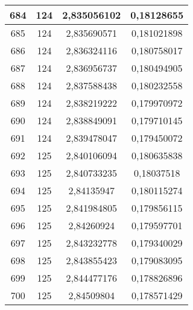 {\begin{minipage}[!h]{0.45\textwidth}
\begin{longtable}{cccc}
684 & 124 & 2,835056102 & 0,18128655 \\ \hline
685 & 124 & 2,835690571 & 0,181021898 \\ \hline
686 & 124 & 2,836324116 & 0,180758017 \\ \hline
687 & 124 & 2,836956737 & 0,180494905 \\ \hline
688 & 124 & 2,837588438 & 0,180232558 \\ \hline
689 & 124 & 2,838219222 & 0,179970972 \\ \hline
690 & 124 & 2,838849091 & 0,179710145 \\ \hline
691 & 124 & 2,839478047 & 0,179450072 \\ \hline
692 & 125 & 2,840106094 & 0,180635838 \\ \hline
693 & 125 & 2,840733235 & 0,18037518 \\ \hline
694 & 125 & 2,84135947 & 0,180115274 \\ \hline
695 & 125 & 2,841984805 & 0,179856115 \\ \hline
696 & 125 & 2,84260924 & 0,179597701 \\ \hline
697 & 125 & 2,843232778 & 0,179340029 \\ \hline
698 & 125 & 2,843855423 & 0,179083095 \\ \hline
699 & 125 & 2,844477176 & 0,178826896 \\ \hline
700 & 125 & 2,84509804 & 0,178571429 \\ \hline
\end{longtable}
\end{minipage}

}
